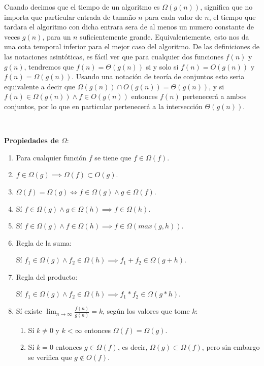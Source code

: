 Cuando decimos que el tiempo de un algoritmo es $\Omega(g(n))$, significa que no importa que particular entrada de tama\~no $n$ para cada valor de $n$, el tiempo que tardara el algoritmo con dicha entrara sera de al menos un numero constante de veces $g(n)$, para un $n$ suficientemente grande. Equivalentemente, esto nos da una cota temporal inferior para el mejor caso del algoritmo. De las definiciones de las notaciones asint\'oticas, es f\'acil ver que para cualquier dos funciones $f(n)$ y $g(n)$, tendremos que $f(n) = \Theta(g(n))$ si y solo si $f(n) = O(g(n))$ y $f(n) = \Omega(g(n))$. Usando una notaci\'on de teor\'ia de conjuntos esto seria equivalente a decir que $\Omega(g(n)) \cap O(g(n)) = \Theta(g(n))$, y si $f(n) \in \Omega(g(n)) \land f \in O(g(n))$ entonces $f(n)$ pertenecer\'a a ambos conjuntos, por lo que en particular pertenecer\'a a la intersecci\'on $\Theta(g(n))$.

~

\textbf{Propiedades de $\Omega$}:
\begin{enumerate}
 \item Para cualquier funci\'on $f$ se tiene que $f \in \Omega(f)$.
 \item $f \in \Omega(g) \implies \Omega(f) \subset O(g)$.
 \item $\Omega(f) = \Omega(g) \iff f \in \Omega(g) \land g \in \Omega(f)$.
 \item S\'i $f \in \Omega(g) \land g \in \Omega(h) \implies f \in \Omega(h)$.
 \item S\'i $f \in \Omega(g) \land f \in \Omega(h) \implies f \in \Omega(max(g,h))$.
 \item Regla de la suma:

	S\'i $f_1 \in \Omega(g) \land f_2 \in \Omega(h) \implies f_1 + f_2 \in \Omega(g+h)$.
 \item Regla del producto:

	S\'i $f_1 \in \Omega(g) \land f_2 \in \Omega(h) \implies f_1 * f_2 \in \Omega(g*h)$.
 \item S\'i existe $\lim_{n \to \infty} \frac{f(n)}{g(n)} = k$, seg\'un los valores que tome $k$:
	\begin{enumerate}
	  \item S\'i $k \neq 0$ y $k < \infty$ entonces $\Omega(f) = \Omega(g)$.
	  \item S\'i $k = 0$ entonces $g \in \Omega(f)$, es decir, $\Omega(g) \subset \Omega(f)$, pero sin embargo se verifica que $g \notin O(f)$.
	\end{enumerate}
\end{enumerate}
